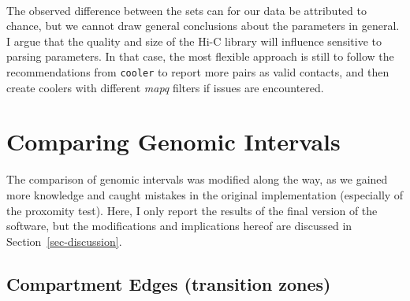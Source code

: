 \documentclass[
  11pt,
  a4paper,
]{scrbook}
\let\origfigure\figure
\let\endorigfigure\endfigure
\renewenvironment{figure}[1][2] {
    \expandafter\origfigure\expandafter[htbp]
} {
    \endorigfigure
}
\begin{document}
\begin{figure}
\begin{minipage}[t]{0.40\linewidth}
{}


\end{minipage}%
%
\begin{minipage}[t]{0.10\linewidth}
~\end{minipage}%

\caption{\label{fig-rs-fb-100-pe-recpe-intervals}Round Spermatid (RS)
and Fibroblast (Fb) at 100kb, comparing the impact of parsing parameters
on A-compartment calling at different viewframes; \emph{arms},
\emph{10Mb}. PE: initial parse (masking complex walks); recPE:
recommended parse (reporting the 5'most unique alignment of a complex
walk).}

\end{figure}%

The observed difference between the sets can for our data be attributed
to chance, but we cannot draw general conclusions about the parameters
in general. I argue that the quality and size of the Hi-C library will
influence sensitive to parsing parameters. In that case, the most
flexible approach is still to follow the recommendations from
\texttt{cooler} to report more pairs as valid contacts, and then create
coolers with different \emph{mapq} filters if issues are encountered.

\section{Comparing Genomic Intervals}\label{comparing-genomic-intervals}

The comparison of genomic intervals was modified along the way, as we
gained more knowledge and caught mistakes in the original implementation
(especially of the proxomity test). Here, I only report the results of
the final version of the software, but the modifications and
implications hereof are discussed in Section~\ref{sec-discussion}.

\subsection{Compartment Edges (transition
zones)}\label{compartment-edges-transition-zones}
\end{document}
